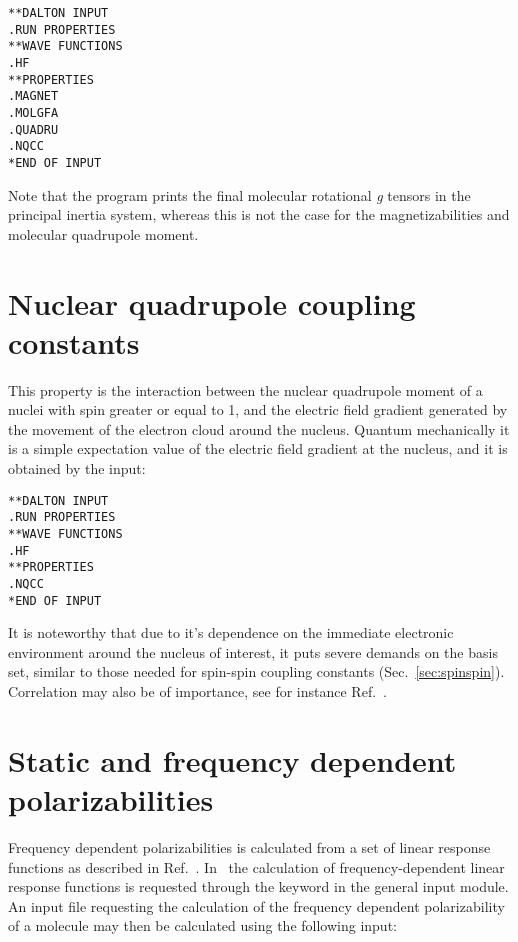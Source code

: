 \begin{verbatim}
**DALTON INPUT
.RUN PROPERTIES
**WAVE FUNCTIONS
.HF
**PROPERTIES
.MAGNET
.MOLGFA
.QUADRU
.NQCC
*END OF INPUT
\end{verbatim}

Note that the program prints the final molecular rotational {\em g}
tensors in the
principal inertia system, whereas this is not the case for the
magnetizabilities and molecular quadrupole moment.

\section{Nuclear quadrupole coupling constants}

This property is the interaction between the nuclear quadrupole
moment
of a nuclei with spin greater or equal to 1, and the electric field gradient
generated by the movement of the electron cloud around the nucleus.
Quantum mechanically it is a simple expectation value of the electric
field gradient  at the nucleus, and it is obtained by the input:

\begin{verbatim}
**DALTON INPUT
.RUN PROPERTIES
**WAVE FUNCTIONS
.HF
**PROPERTIES
.NQCC
*END OF INPUT
\end{verbatim}

It is noteworthy that due to it's dependence on the immediate
electronic environment around the nucleus of interest, it puts severe
demands on the basis set, similar to those needed for spin-spin
coupling
constants (Sec.~\ref{sec:spinspin}). Correlation may also be of
importance, see for instance Ref.~\cite{mjssocpjthkrcpl243}.

\section{Static and frequency dependent
polarizabilities}\label{sec:polari}

Frequency dependent polarizabilities is
calculated from a set of linear 
response functions as described in
Ref.~\cite{jopjjcp82}. In \aba\ the 
calculation of frequency-dependent linear response functions is
requested through the keyword  in the general input
module. An input file requesting the calculation of the frequency
dependent polarizability of a molecule may then be calculated using
the following input:

